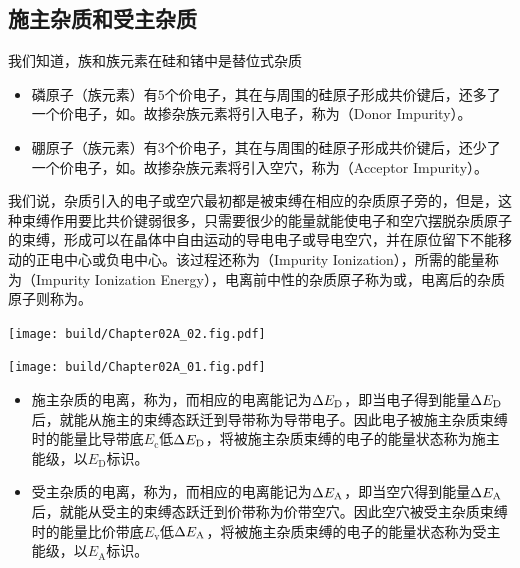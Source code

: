 \subsection{施主杂质和受主杂质}
我们知道，族和族元素在硅和锗中是替位式杂质
\begin{itemize}
    \item 磷原子（\hspace{0.35em}\hspace{0.35em}族元素）有$5$个价电子，其在与周围的硅原子形成共价键后，还多了一个价电子，如。故掺杂\hspace{0.5em}\hspace{0.5em}族元素将引入电子，称为（Donor Impurity）。
    \item 硼原子（族元素）有$3$个价电子，其在与周围的硅原子形成共价键后，还少了一个价电子，如。故掺杂族元素将引入空穴，称为（Acceptor Impurity）。
\end{itemize}
我们说，杂质引入的电子或空穴最初都是被束缚在相应的杂质原子旁的，但是，这种束缚作用要比共价键弱很多，只需要很少的能量就能使电子和空穴摆脱杂质原子的束缚，形成可以在晶体中自由运动的导电电子或导电空穴，并在原位留下不能移动的正电中心或负电中心。该过程还称为（Impurity Ionization），所需的能量称为（Impurity Ionization Energy），电离前中性的杂质原子称为或，电离后的杂质原子则称为。
\begin{Figure}[施主杂质和受主杂质]
    \begin{FigureSub}[施主杂质]
        \texttt{[image: build/Chapter02A\_02.fig.pdf]}
    \end{FigureSub}
    \hspace{1cm}
    \begin{FigureSub}[受主杂质]
        \texttt{[image: build/Chapter02A\_01.fig.pdf]}
    \end{FigureSub}
\end{Figure}

\begin{itemize}
    \item 施主杂质的电离，称为，而相应的电离能记为$\Delta{E_\text{D}}$，即当电子得到能量$\Delta{E_\text{D}}$后，就能从施主的束缚态跃迁到导带称为导带电子。因此电子被施主杂质束缚时的能量比导带底$E_\text{c}$低$\Delta{E_\text{D}}$，将被施主杂质束缚的电子的能量状态称为施主能级，以$E_\text{D}$标识。
    \item 受主杂质的电离，称为，而相应的电离能记为$\Delta{E_\text{A}}$，即当空穴得到能量$\Delta{E_\text{A}}$后，就能从受主的束缚态跃迁到价带称为价带空穴。因此空穴被受主杂质束缚时的能量比价带底$E_\text{v}$低$\Delta{E_\text{A}}$，将被施主杂质束缚的电子的能量状态称为受主能级，以$E_\text{A}$标识。
\end{itemize}

